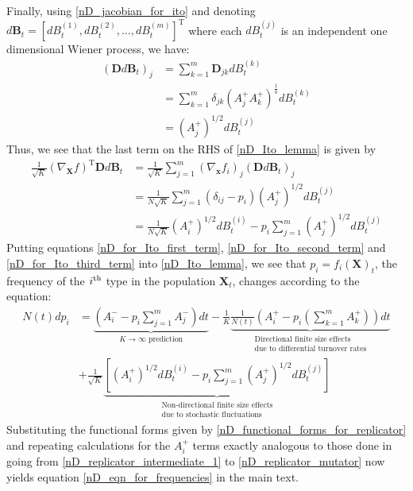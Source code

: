 Finally, using \eqref{nD_jacobian_for_ito} and denoting $d\mathbf{B}_t = [dB^{(1)}_t,dB^{(2)}_t, \ldots, dB^{(m)}_t]^{\mathrm{T}}$ where each $dB^{(j)}_t$ is an independent one dimensional Wiener process, we have:
\begin{align}
\left(\mathbf{D}d\mathbf{B}_t\right)_j &= \sum\limits_{k=1}^{m}\mathbf{D}_{jk}dB^{(k)}_t\nonumber\\
&= \sum\limits_{k=1}^{m}\delta_{jk}\left(A^{+}_{j}A^{+}_{k}\right)^{\frac{1}{4}}dB^{(k)}_t\\
&= \left(A^{+}_{j}\right)^{1/2}dB^{(j)}_t
\end{align}
Thus, we see that the last term on the RHS of \eqref{nD_Ito_lemma} is given by
\begin{align}
\frac{1}{\sqrt{K}}\left(\nabla_{\mathbf{X}}f\right)^{\mathrm{T}}\mathbf{D}d\mathbf{B}_t &= \frac{1}{\sqrt{K}}\sum\limits_{j=1}^{m}\left(\nabla_{\mathbf{x}} f_i\right)_j\left(\mathbf{D}d\mathbf{B}_t\right)_j\nonumber\\
&=  \frac{1}{N\sqrt{K}}\sum\limits_{j=1}^{m}\left(\delta_{ij}-p_i\right)\left(A^{+}_{j}\right)^{1/2}dB^{(j)}_t\\
&= \frac{1}{N\sqrt{K}}\left(A^{+}_{i}\right)^{1/2}dB^{(i)}_t - p_i\sum\limits_{j=1}^{m}\left(A^{+}_{j}\right)^{1/2}dB^{(j)}_t\label{nD_for_Ito_third_term}
\end{align}
Putting equations \eqref{nD_for_Ito_first_term}, \eqref{nD_for_Ito_second_term} and \eqref{nD_for_Ito_third_term} into \eqref{nD_Ito_lemma}, we see that $p_i = f_i(\mathbf{X})_t$, the frequency of the $i\textsuperscript{th}$ type in the population $\mathbf{X}_t$, changes according to the equation:
\begin{equation}
\begin{aligned}
N(t) dp_i &= \underbrace{\left(A^{-}_{i} - p_i\sum\limits_{j=1}^{m}A^{-}_{j}\right)dt}_{\text{$K \to \infty$ prediction}} - \frac{1}{K}\underbrace{\frac{1}{N(t)}\left(A^{+}_{i}-p_i\left(\sum\limits_{k=1}^{m} A^{+}_k\right)\right)dt}_{\substack{\text{Directional finite size effects}\\\text{due to differential turnover rates}}}\\
&+ \frac{1}{\sqrt{K}}\underbrace{\left[\left(A^{+}_{i}\right)^{1/2}dB^{(i)}_t - p_i\sum\limits_{j=1}^{m}\left(A^{+}_{j}\right)^{1/2}dB^{(j)}_t\right]}_{\substack{\text{Non-directional finite size effects}\\\text{due to stochastic fluctuations}}}
\end{aligned}
\end{equation}
Substituting the functional forms given by \eqref{nD_functional_forms_for_replicator} and repeating calculations for the $A^{+}_i$ terms exactly analogous to those done in going from \eqref{nD_replicator_intermediate_1} to \eqref{nD_replicator_mutator} now yields equation \eqref{nD_eqn_for_frequencies} in the main text.